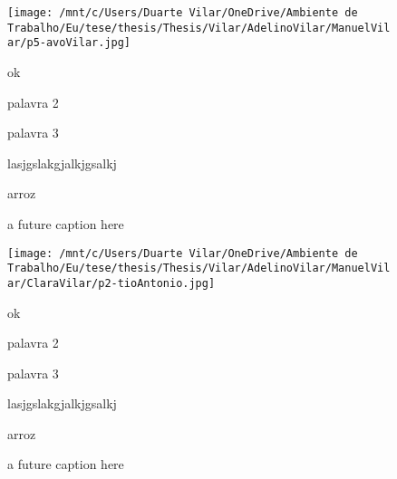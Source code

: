 \documentclass{article}
\begin{document}
    \begin{figure}[ht!]
        \begin{minipage}{0.35\textwidth}
            \centering
            \texttt{[image: /mnt/c/Users/Duarte Vilar/OneDrive/Ambiente de Trabalho/Eu/tese/thesis/Thesis/Vilar/AdelinoVilar/ManuelVilar/p5-avoVilar.jpg]}
            \caption{a future caption here}
        \end{minipage}
        \hspace{1cm} %
        \begin{minipage}{0.3\textwidth}
            ok

            palavra 2

            palavra 3

            lasjgslakgjalkjgsalkj

            arroz
            
        \end{minipage}
    \end{figure}



    \begin{figure}[ht!]
        \begin{minipage}{0.35\textwidth}
            \centering
            \texttt{[image: /mnt/c/Users/Duarte Vilar/OneDrive/Ambiente de Trabalho/Eu/tese/thesis/Thesis/Vilar/AdelinoVilar/ManuelVilar/ClaraVilar/p2-tioAntonio.jpg]}
            \caption{a future caption here}
        \end{minipage}
        \hspace{1cm} %
        \begin{minipage}{0.3\textwidth}
            ok

            palavra 2

            palavra 3

            lasjgslakgjalkjgsalkj

            arroz
            
        \end{minipage}
    \end{figure}
\end{document}
